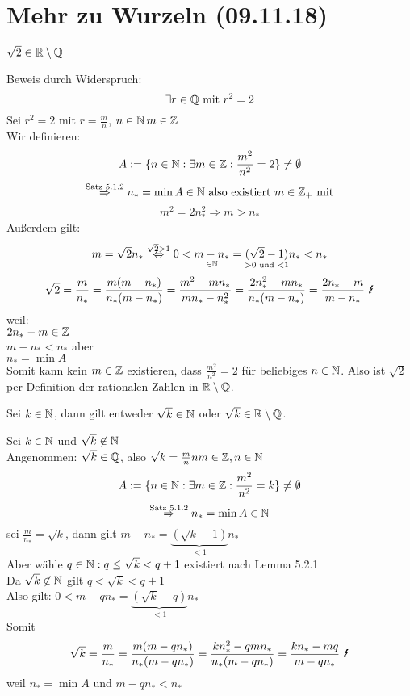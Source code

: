 \documentclass[../ana1u.tex]{subfiles}
\begin{document}
\setcounter{section}{2}

\section{Mehr zu Wurzeln (09.11.18)}
\begin{bsp} [Exkurs]
    \begin{beh}
        \(\sqrt{2} \in \mathbb{R} \setminus \mathbb{Q}\)
    \end{beh}
    \begin{bew}
        Beweis durch Widerspruch:
        \[\exists r \in \mathbb{Q} \text{ mit } r^2 = 2\]
        Sei \(r^2 = 2\) mit \(r = \frac{m}{n}\), \(n \in \mathbb{N}\, m \in \mathbb{Z}\)\\
        Wir definieren:
        \[A := \{n \in \mathbb{N}: \exists m \in \mathbb{Z}: \frac{m^2}{n^2} = 2\} \neq \emptyset\]
        \[\overset{\text{Satz 5.1.2}}{\Rightarrow} n_* = \min A \in \mathbb{N} \text{ also existiert } m \in \mathbb{Z}_+ \text{ mit}\]
        \[m^2 = 2n_*^2 \Rightarrow m > n_* \]
        Außerdem gilt:
        \[m = \sqrt{2}n_* \overset{\sqrt{2} > 1}{\Leftrightarrow} 0 < \underset{\in \mathbb{N}}{m - n_*} = \underset{> 0 \text{ und } < 1}{(\sqrt{2} - 1)}n_* < n_*\]
        \[\sqrt{2} = \frac{m}{n_*} = \frac{m(m - n_*)}{n_*(m - n_*)} = \frac{m^2 - mn_*}{mn_* - n_*^2} = \frac{2n_*^2 - mn_*}{n_*(m-n_*)} = \frac{2n_*-m}{m-n_*} \text{ \Lightning}\]
        weil:\\
        \(2n_* - m \in \mathbb{Z}\)\\
        \(m - n_* < n_*\) aber\\
        \(n_* = \min A\)\\
        Somit kann kein \(m \in \mathbb{Z}\) existieren, dass \(\frac{m^2}{n^2} = 2\) für beliebiges \(n \in \mathbb{N}\). Also ist \(\sqrt{2}\) per Definition der rationalen Zahlen in \(\mathbb{R} \setminus \mathbb{Q}\).
    \end{bew}
    \begin{satz}
        Sei \(k \in \mathbb{N}\), dann gilt entweder \(\sqrt{k} \in \mathbb{N}\) oder \(\sqrt{k} \in \mathbb{R} \setminus \mathbb{Q}\).
    \end{satz}
    \begin{bew}
        Sei \(k \in \mathbb{N}\) und \(\sqrt{k} \not\in \mathbb{N}\)\\
        Angenommen: \(\sqrt{k} \in \mathbb{Q}\), also \(\sqrt{k} = \frac{m}{n}n m \in \mathbb{Z}, n \in \mathbb{N}\)\\
        \[A := \{n \in \mathbb{N}: \exists m \in \mathbb{Z}: \frac{m^2}{n^2} = k\} \neq \emptyset\]
        \[\overset{\text{Satz 5.1.2}}{\Rightarrow} n_* = \min A \in \mathbb{N}\]
        sei \(\frac{m}{n_*} = \sqrt{k}\), dann gilt \(m - n_* = \underbrace{(\sqrt{k}-1)}_{<1}n_*\)\\
        Aber wähle \(q \in \mathbb{N}: q \leq \sqrt{k} < q + 1\) existiert nach Lemma 5.2.1\\
        Da \(\sqrt{k} \not \in \mathbb{N}\) gilt \(q < \sqrt{k} < q + 1\)\\
        Also gilt: \(0 < m - qn_* = \underbrace{(\sqrt{k}-q)}_{<1}n_*\)\\
        Somit
        \[\sqrt{k} = \frac{m}{n_*} = \frac{m(m - qn_*)}{n_*(m - qn_*)} = \frac{kn_*^2 - qmn_*}{n_*(m-qn_*)} = \frac{kn_* - mq}{m - qn_*} \text{ \Lightning}\]
        weil \(n_* = \min A\) und \(m - qn_* < n_*\)
    \end{bew}
\end{bsp}
\end{document}
